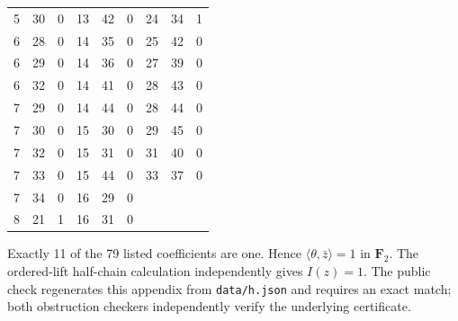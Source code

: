 \documentclass[11pt]{article}
\begin{document}
\begin{appendices}
\begin{center}
\begin{tabular}{r r r @{\qquad} r r r @{\qquad} r r r}
5 & 30 & 0 & 13 & 42 & 0 & 24 & 34 & 1\\
6 & 28 & 0 & 14 & 35 & 0 & 25 & 42 & 0\\
6 & 29 & 0 & 14 & 36 & 0 & 27 & 39 & 0\\
6 & 32 & 0 & 14 & 41 & 0 & 28 & 43 & 0\\
7 & 29 & 0 & 14 & 44 & 0 & 28 & 44 & 0\\
7 & 30 & 0 & 15 & 30 & 0 & 29 & 45 & 0\\
7 & 32 & 0 & 15 & 31 & 0 & 31 & 40 & 0\\
7 & 33 & 0 & 15 & 44 & 0 & 33 & 37 & 0\\
7 & 34 & 0 & 16 & 29 & 0 &  &  & \\
8 & 21 & 1 & 16 & 31 & 0 &  &  & \\
\end{tabular}\end{center}
Exactly 11 of the 79 listed coefficients are one. Hence
$\langle\theta,\bar z\rangle=1$ in $\mathbf F_2$. The ordered-lift
half-chain calculation independently gives $I(z)=1$.
The public check regenerates this appendix from \texttt{data/h.json}
and requires an exact match; both obstruction checkers independently
verify the underlying certificate.
\end{appendices}
\end{document}
